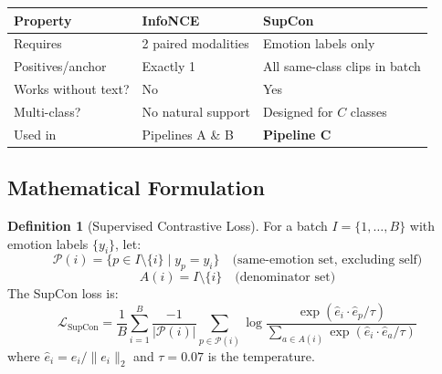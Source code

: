 \documentclass[12pt,a4paper]{article}
\theoremstyle{definition}
\newtheorem{definition}{Definition}[section]
\theoremstyle{plain}
\theoremstyle{remark}
\begin{document}
\begin{center}
\renewcommand{\arraystretch}{1.15}
\begin{tabular}{@{}lll@{}}
\toprule
\textbf{Property} & \textbf{InfoNCE} & \textbf{SupCon} \\
\midrule
Requires          & 2 paired modalities      & Emotion labels only \\
Positives/anchor  & Exactly 1                & All same-class clips in batch \\
Works without text? & No                     & Yes \\
Multi-class?      & No natural support       & Designed for $C$ classes \\
Used in           & Pipelines A \& B         & \textbf{Pipeline C} \\
\bottomrule
\end{tabular}
\end{center}

\subsection{Mathematical Formulation}

\begin{definition}[Supervised Contrastive Loss]
For a batch $I=\{1,\ldots,B\}$ with emotion labels $\{y_i\}$, let:
\[
  \mathcal{P}(i) = \{p \in I \setminus \{i\} \mid y_p = y_i\}
  \quad\text{(same-emotion set, excluding self)}
\]
\[
  A(i) = I \setminus \{i\} \quad\text{(denominator set)}
\]
The SupCon loss is:
\begin{equation}\label{eq:supcon}
\boxed{
\mathcal{L}_{\mathrm{SupCon}} =
\frac{1}{B}\sum_{i=1}^{B}
\frac{-1}{|\mathcal{P}(i)|}
\sum_{p\in\mathcal{P}(i)}
\log\frac{\exp(\hat{e}_i\cdot\hat{e}_p/\tau)}
         {\displaystyle\sum_{a\in A(i)}\exp(\hat{e}_i\cdot\hat{e}_a/\tau)}
}
\end{equation}
where $\hat{e}_i = e_i/\|e_i\|_2$ and $\tau=0.07$ is the temperature.
\end{definition}
\end{document}
